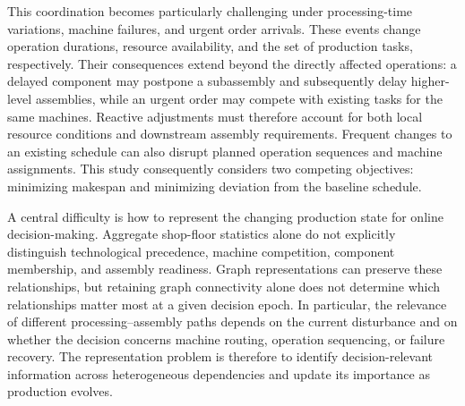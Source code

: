 This coordination becomes particularly challenging under processing-time variations, machine failures,
and urgent order arrivals. These events change operation durations, resource availability,
and the set of production tasks, respectively. Their consequences extend beyond the directly affected operations:
a delayed component may postpone a subassembly and subsequently delay higher-level assemblies,
while an urgent order may compete with existing tasks for the same machines. Reactive adjustments must
therefore account for both local resource conditions and downstream assembly requirements.
Frequent changes to an existing schedule can also disrupt planned operation sequences and machine assignments.
This study consequently considers two competing objectives: minimizing makespan and minimizing deviation
from the baseline schedule.







A central difficulty is how to represent the changing production state for online decision-making.
Aggregate shop-floor statistics alone do not explicitly distinguish technological precedence,
machine competition, component membership, and assembly readiness. Graph representations can preserve these relationships,
but retaining graph connectivity alone does not determine which relationships matter most at a given decision epoch.
In particular, the relevance of different processing--assembly paths depends on the current disturbance
and on whether the decision concerns machine routing, operation sequencing, or failure recovery.
The representation problem is therefore to identify decision-relevant information across heterogeneous
dependencies and update its importance as production evolves.

